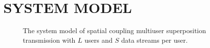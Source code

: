 \documentclass[conference]{IEEEtran}
\begin{document}




\section{SYSTEM MODEL}
\begin{figure}[ht]
\setlength{\abovecaptionskip}{0.cm}
\setlength{\belowcaptionskip}{-0.cm}
  \caption{The system model of spatial coupling multiuser superposition transmission with $L$ users and $S$ data streams per user.}\label{fig.1}
    \vspace{-2em}
\end{figure}
\end{document}
